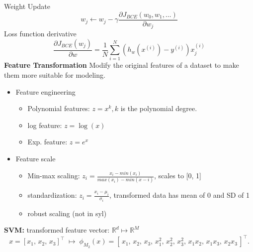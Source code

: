 \documentclass[8pt,twocolumn]{article}
\begin{document}
Weight Update
\[w_j \leftarrow w_j - \gamma \frac{\partial J_{BCE}(w_0, w_1, \dots)}{\partial w_j}\]
Loss function derivative
\[\frac{\partial J_{BCE}(w_j)}{\partial w} = \frac{1}{N} \sum_{i=1}^{N} (h_w(x^{(i)}) - y^{(i)})x_j^{(i)}\]
\textbf{Feature Transformation}
    Modify the original features of a dataset to make them more suitable for modeling.\vspace{-0.6em}
    \begin{itemize}
        \setlength{\itemsep}{0pt}
        \setlength{\parskip}{0pt}
        \item Feature engineering\vspace{-0.6em}
            \begin{itemize}
                \setlength{\itemsep}{0pt}
                \setlength{\parskip}{0pt}
                \item Polynomial features: $z = x^k, k$ is the polynomial degree.
                \item log feature: $z = \log(x)$
                \item Exp. feature: $z = e^x$
            \end{itemize}
        \item Feature scale \vspace{-0.6em}
            \begin{itemize}
                \setlength{\itemsep}{0pt}
                \setlength{\parskip}{0pt}
                \item Min-max scaling: $z_i = \frac{x_i - min(x_i)}{max(x_i) - min(x-i)}$, scales to [0, 1]
                \item standardization: $z_i = \frac{x_i - \mu_i}{\sigma_i}$, transformed data has mean of 0 and SD of 1
                \item robust scaling (not in syl)
            \end{itemize}
    \end{itemize}\vspace{-0.6em}
\textbf{SVM:} transformed feature vector: $\mathbb{R}^{d} \mapsto \mathbb{R}^{M}$
\[
x = [x_1,\,x_2,\,x_3]^\top
\;\mapsto\;
\phi_{M_2}(x)
= [\,x_1,\,x_2,\,x_3,\,x_1^2,\,x_2^2,\,x_3^2,\,x_1x_2,\,x_1x_3,\,x_2x_3\,]^\top.
\]
\end{document}
